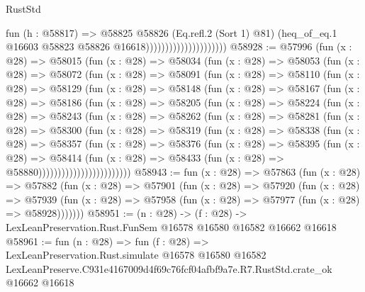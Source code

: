 \begin{lexlean}{RustStd}
\begin{coremodule}
                                          fun (h : @58817) =>
                                          @58825
                                            @58826
                                            (Eq.refl.{2} (Sort 1) @81)
                                            (heq_of_eq.{1}
                                              @16603
                                              @58823
                                              @58826
                                              @16618)))))))))))))))))))))
@58928 := @57996
    (fun (x : @28) =>
    @58015
      (fun (x : @28) =>
      @58034
        (fun (x : @28) =>
        @58053
          (fun (x : @28) =>
          @58072
            (fun (x : @28) =>
            @58091
              (fun (x : @28) =>
              @58110
                (fun (x : @28) =>
                @58129
                  (fun (x : @28) =>
                  @58148
                    (fun (x : @28) =>
                    @58167
                      (fun (x : @28) =>
                      @58186
                        (fun (x : @28) =>
                        @58205
                          (fun (x : @28) =>
                          @58224
                            (fun (x : @28) =>
                            @58243
                              (fun (x : @28) =>
                              @58262
                                (fun (x : @28) =>
                                @58281
                                  (fun (x : @28) =>
                                  @58300
                                    (fun (x : @28) =>
                                    @58319
                                      (fun (x : @28) =>
                                      @58338
                                        (fun (x : @28) =>
                                        @58357
                                          (fun (x : @28) =>
                                          @58376
                                            (fun (x : @28) =>
                                            @58395
                                              (fun (x : @28) =>
                                              @58414
                                                (fun (x : @28) =>
                                                @58433
                                                  (fun (x : @28) => @58880))))))))))))))))))))))))
@58943 := fun (x : @28) =>
  @57863
    (fun (x : @28) =>
    @57882
      (fun (x : @28) =>
      @57901
        (fun (x : @28) =>
        @57920
          (fun (x : @28) =>
          @57939 (fun (x : @28) => @57958 (fun (x : @28) => @57977 (fun (x : @28) => @58928)))))))
@58951 := (n : @28) ->
  (f : @28) -> LexLeanPreservation.Rust.FunSem @16578 @16580 @16582 @16662 @16618
@58961 := fun (n : @28) =>
  fun (f : @28) =>
  LexLeanPreservation.Rust.simulate
    @16578
    @16580
    @16582
    LexLeanPreserve.C931e4167009d4f69c76fcf04afbf9a7e.R7.RustStd.crate_ok
    @16662
    @16618
\end{coremodule}
\end{lexlean}
